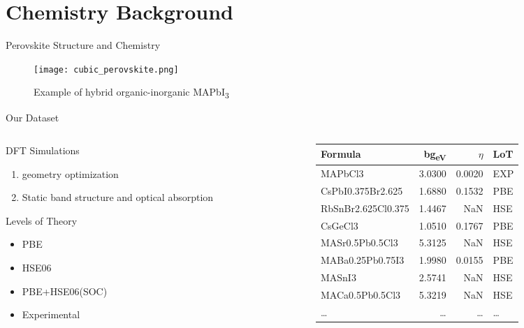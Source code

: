 \documentclass[10pt, compress]{beamer}
\begin{document}
\section{Chemistry Background}
\label{sec:orgef4941f}
\begin{frame}[label={sec:org0e3631d}]{Perovskite Structure and Chemistry}
\begin{figure}[htbp]
\centering
\texttt{[image: cubic\_perovskite.png]}
\caption{Example of hybrid organic-inorganic MAPbI\textsubscript{3} \cite{mannodi-kanakkithodi-2022-data-driven}}
\end{figure}
\end{frame}
\begin{frame}[label={sec:org58bbada}]{Our Dataset}
\begin{columns}
\begin{column}{0.35\columnwidth}
\begin{block}{DFT Simulations}
\begin{enumerate}
\item geometry optimization
\item Static band structure and optical absorption
\end{enumerate}
\end{block}
\begin{block}{Levels of Theory}
\begin{itemize}
\item PBE
\item HSE06
\item PBE+HSE06(SOC)
\item Experimental
\end{itemize}
\end{block}
\end{column}
\begin{column}{0.65\columnwidth}
\begin{center}
\begin{tabular}{lrrl}
Formula & bg\textsubscript{eV} & \(\eta\) & LoT\\
\hline
MAPbCl3 & 3.0300 & 0.0020 & EXP\\
CsPbI0.375Br2.625 & 1.6880 & 0.1532 & PBE\\
RbSnBr2.625Cl0.375 & 1.4467 & NaN & HSE\\
CsGeCl3 & 1.0510 & 0.1767 & PBE\\
MASr0.5Pb0.5Cl3 & 5.3125 & NaN & HSE\\
MABa0.25Pb0.75I3 & 1.9980 & 0.0155 & PBE\\
MASnI3 & 2.5741 & NaN & HSE\\
MACa0.5Pb0.5Cl3 & 5.3219 & NaN & HSE\\
\ldots{} & \ldots{} & \ldots{} & \ldots{}\\
\end{tabular}
\end{center}
\end{column}
\end{columns}
\end{frame}
\end{document}
